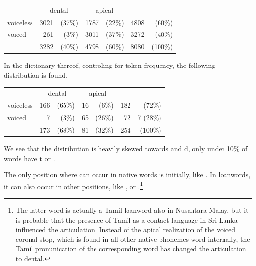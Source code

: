 
\begin{center}
\begin{tabular}{lrrrr|rr}
		& \multicolumn{2}{c}{dental}&\multicolumn{2}{c}{apical}\\
voiceless 	& 3021& (37\%)	& 1787& (22\%)	& 4808& (60\%) 	     \\
voiced 		& 261 & (3\%)	& 3011& (37\%)	& 3272 &	(40\%)     \\
\hline
 		& 3282 &(40\%)	& 4798 &(60\%)	& 8080& (100\%)\\
\end{tabular}
\end{center}

In the dictionary thereof, controling for token frequency, the following distribution is found.

\begin{center}
\begin{tabular}{lrrrr|rr}
		& \multicolumn{2}{c}{dental}&\multicolumn{2}{c}{apical}\\
voiceless 	& 166& (65\%)	& 16 &(6\%)	& 182& (72\%)\\
voiced 		& 7 &(3\%)	& 65& (26\%)	& 72&7 (28\%)\\
\hline
		& 173 &(68\%)	& 81 &(32\%)	&254 & (100\%)
\end{tabular}
\end{center}

We see that the distribution is heavily skewed towards \dentt{} and d, only under 10\% of  words have t or \dentd{}.

The only position where \dentd{} can occur in native words is initially, like . In loanwords, it can also occur in other positions, like \kuckn, or .\footnote{The latter word is actually a Tamil loanword also in Nusantara Malay, but it is probable that the presence of Tamil as a contact language in Sri Lanka influenced the articulation. Instead of the apical realization of the voiced coronal stop, which is found in all other native phonemes word-internally, the Tamil pronunication of the corresponding word has changed the articulation to dental.}

